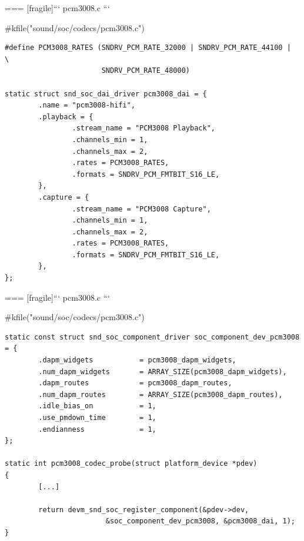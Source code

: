 === [fragile]{``` pcm3008.c ```}
  \begin{block}{#kfile("sound/soc/codecs/pcm3008.c")}
    \fontsize{9}{9}\selectfont
    \begin{verbatim}
#define PCM3008_RATES (SNDRV_PCM_RATE_32000 | SNDRV_PCM_RATE_44100 |        \
                       SNDRV_PCM_RATE_48000)

static struct snd_soc_dai_driver pcm3008_dai = {
        .name = "pcm3008-hifi",
        .playback = {
                .stream_name = "PCM3008 Playback",
                .channels_min = 1,
                .channels_max = 2,
                .rates = PCM3008_RATES,
                .formats = SNDRV_PCM_FMTBIT_S16_LE,
        },
        .capture = {
                .stream_name = "PCM3008 Capture",
                .channels_min = 1,
                .channels_max = 2,
                .rates = PCM3008_RATES,
                .formats = SNDRV_PCM_FMTBIT_S16_LE,
        },
};
    \end{verbatim}
  \end{block}


=== [fragile]{``` pcm3008.c ```}
  \begin{block}{#kfile("sound/soc/codecs/pcm3008.c")}
    \fontsize{9}{9}\selectfont
    \begin{verbatim}
static const struct snd_soc_component_driver soc_component_dev_pcm3008 = {
        .dapm_widgets           = pcm3008_dapm_widgets,
        .num_dapm_widgets       = ARRAY_SIZE(pcm3008_dapm_widgets),
        .dapm_routes            = pcm3008_dapm_routes,
        .num_dapm_routes        = ARRAY_SIZE(pcm3008_dapm_routes),
        .idle_bias_on           = 1,
        .use_pmdown_time        = 1,
        .endianness             = 1,
};

static int pcm3008_codec_probe(struct platform_device *pdev)
{
        [...]

        return devm_snd_soc_register_component(&pdev->dev,
                        &soc_component_dev_pcm3008, &pcm3008_dai, 1);
}
    \end{verbatim}
  \end{block}



